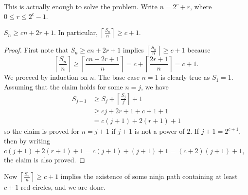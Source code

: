 This is actually enough to solve the problem.
Write $n = 2^c + r$, where $0 \leq r \leq 2^c - 1$.
\begin{claim*}
$S_n \geq cn + 2r + 1$. In particular, $\left\lceil \frac{S_n}{n} \right\rceil \geq c + 1$.
\end{claim*}

\begin{proof}
First note that $S_n \geq cn + 2r + 1$ implies
$\left\lceil \frac{S_n}{n} \right\rceil \geq c + 1$ because
\[ \left\lceil \frac{S_n}{n} \right\rceil \geq \left\lceil \frac{cn + 2r + 1}{n} \right\rceil
= c + \left\lceil \frac{2r + 1}{n} \right\rceil = c + 1.
\]
We proceed by induction on $n$.
The base case $n = 1$ is clearly true as $S_1 = 1$.
Assuming that the claim holds for some $n=j$, we have
\begin{align*}
    S_{j+1} &\geq S_j + \left\lceil \frac{S_j}{j} \right\rceil + 1 \\
    &\geq cj + 2r + 1 + c + 1 + 1 \\
    &= c(j+1) + 2(r+1) + 1
\end{align*}
so the claim is proved for $n=j+1$ if $j+1$ is not a power of $2$.
If $j+1 = 2^{c+1}$, then by writing
$c(j+1) + 2(r+1) + 1 = c(j+1) + (j+1) + 1 = (c+2)(j+1) + 1$, the claim is also proved.
\end{proof}

Now $\left\lceil \frac{S_n}{n} \right\rceil \geq c + 1$ implies the existence of
some ninja path containing at least $c+1$ red circles, and we are done.
\pagebreak